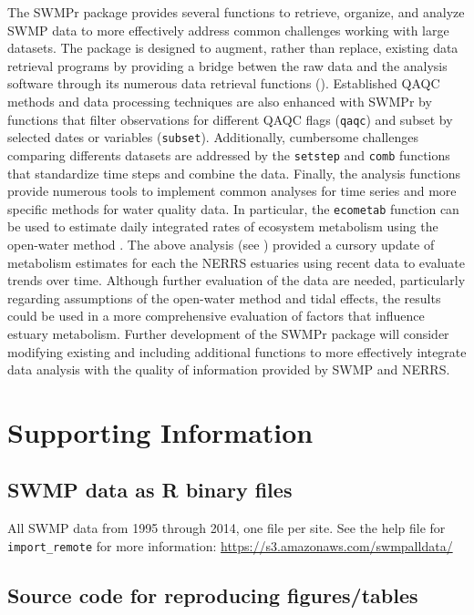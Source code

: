 \documentclass[10pt,letterpaper]{article}\usepackage[]{graphicx}\usepackage[]{color}
\begin{document}
The SWMPr package provides several functions to retrieve, organize, and analyze \ac{SWMP} data to more effectively address common challenges working with large datasets.  The package is designed to augment, rather than replace, existing data retrieval programs by providing a bridge betwen the raw data and the analysis software through its numerous data retrieval functions ().  Established \ac{QAQC} methods and data processing techniques are also enhanced with SWMPr by functions that filter observations for different \ac{QAQC} flags (\texttt{qaqc}) and subset by selected dates or variables (\texttt{subset}).  Additionally, cumbersome challenges comparing differents datasets are addressed by the \texttt{setstep} and \texttt{comb} functions that standardize time steps and combine the data.  Finally, the analysis functions provide numerous tools to implement common analyses for time series and more specific methods for water quality data.  In particular, the \texttt{ecometab} function can be used to estimate daily integrated rates of ecosystem metabolism using the open-water method \cite{Odum56,Caffrey14}.  The above analysis (see ) provided a cursory update of metabolism estimates for each the \ac{NERRS} estuaries using recent data to evaluate trends over time.  Although further evaluation of the data are needed, particularly regarding assumptions of the open-water method and tidal effects, the results could be used in a more comprehensive evaluation of factors that influence estuary metabolism. Further development of the SWMPr package will consider modifying existing and including additional functions to more effectively integrate data analysis with the quality of information provided by \ac{SWMP} and \ac{NERRS}. 

\section*{Supporting Information}
\label{supp_info}

\subsection*{\ac{SWMP} data as R binary files}

All \ac{SWMP} data from 1995 through 2014, one file per site. See the help file for \texttt{import\_remote} for more information: \href{https://s3.amazonaws.com/swmpalldata/}{https://s3.amazonaws.com/swmpalldata/}

\subsection*{Source code for reproducing figures/tables}
\end{document}
